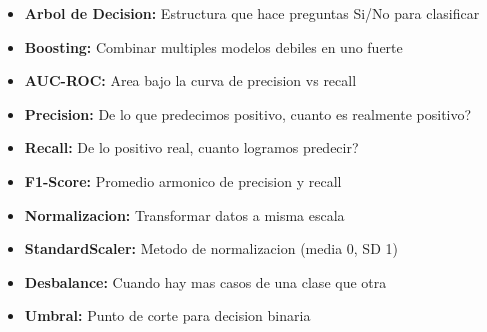 \documentclass[11pt]{article}
\begin{document}
\begin{itemize}
\item \textbf{Arbol de Decision:} Estructura que hace preguntas Si/No para clasificar
\item \textbf{Boosting:} Combinar multiples modelos debiles en uno fuerte
\item \textbf{AUC-ROC:} Area bajo la curva de precision vs recall
\item \textbf{Precision:} De lo que predecimos positivo, cuanto es realmente positivo?
\item \textbf{Recall:} De lo positivo real, cuanto logramos predecir?
\item \textbf{F1-Score:} Promedio armonico de precision y recall
\item \textbf{Normalizacion:} Transformar datos a misma escala
\item \textbf{StandardScaler:} Metodo de normalizacion (media 0, SD 1)
\item \textbf{Desbalance:} Cuando hay mas casos de una clase que otra
\item \textbf{Umbral:} Punto de corte para decision binaria
\end{itemize}
\end{document}
